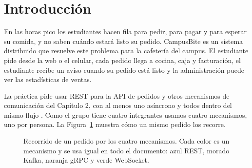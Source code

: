 \section{Introducción}

En las horas pico los estudiantes hacen fila para pedir, para pagar y para esperar su comida, y no saben cuándo estará listo su pedido. CampusBite es un sistema distribuido que resuelve este problema para la cafetería del campus. El estudiante pide desde la web o el celular, cada pedido llega a cocina, caja y facturación, el estudiante recibe un aviso cuando su pedido está listo y la administración puede ver las estadísticas de ventas.

La práctica pide usar REST para la API de pedidos y otros mecanismos de comunicación del Capítulo 2, con al menos uno asíncrono y todos dentro del mismo flujo \parencite{timbi2026comunicacion}. Como el grupo tiene cuatro integrantes usamos cuatro mecanismos, uno por persona. La Figura~\ref{fig:resumen} muestra cómo un mismo pedido los recorre.

\begin{figure}[H]
\centering
{}
\caption{Recorrido de un pedido por los cuatro mecanismos. Cada color es un mecanismo y se usa igual en todo el documento: azul REST, morado Kafka, naranja gRPC y verde WebSocket.}
\label{fig:resumen}
\end{figure}

